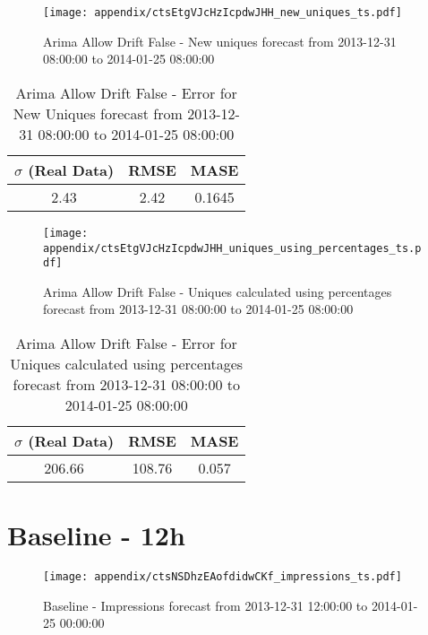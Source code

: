 \begin{figure}[H] \begin{center} \leavevmode
\texttt{[image: appendix/ctsEtgVJcHzIcpdwJHH\_new\_uniques\_ts.pdf]} \caption[]{
Arima Allow Drift False - New uniques forecast from 2013-12-31 08:00:00 to 2014-01-25 08:00:00} \label{fig:appendix/ctsEtgVJcHzIcpdwJHH_new_uniques_ts.pdf} \end{center}
\end{figure}

\begin{table}[H]
\centering
\footnotesize
\begin{tabular}{ccc}
$\sigma$ (Real Data) & RMSE & MASE   \\ \hline
2.43 & 2.42 & 0.1645 \\
\end{tabular}

\vspace{0.5cm}

\caption[]{
Arima Allow Drift False - Error for New Uniques forecast from 2013-12-31 08:00:00 to 2014-01-25 08:00:00}
\end{table}

\begin{figure}[H] \begin{center} \leavevmode
\texttt{[image: appendix/ctsEtgVJcHzIcpdwJHH\_uniques\_using\_percentages\_ts.pdf]} \caption[]{
Arima Allow Drift False - Uniques calculated using percentages forecast from 2013-12-31 08:00:00 to 2014-01-25 08:00:00} \label{fig:appendix/ctsEtgVJcHzIcpdwJHH_uniques_using_percentages_ts.pdf} \end{center}
\end{figure}

\begin{table}[H]
\centering
\footnotesize
\begin{tabular}{ccc}
$\sigma$ (Real Data) & RMSE & MASE   \\ \hline
206.66 & 108.76 & 0.057 \\
\end{tabular}

\vspace{0.5cm}

\caption[]{
Arima Allow Drift False - Error for Uniques calculated using percentages forecast from 2013-12-31 08:00:00 to 2014-01-25 08:00:00}
\end{table}

\section{Baseline - 12h}
\begin{figure}[H] \begin{center} \leavevmode
\texttt{[image: appendix/ctsNSDhzEAofdidwCKf\_impressions\_ts.pdf]} \caption[]{
Baseline - Impressions forecast from 2013-12-31 12:00:00 to 2014-01-25 00:00:00} \label{fig:appendix/ctsNSDhzEAofdidwCKf_impressions_ts.pdf} \end{center}
\end{figure}

